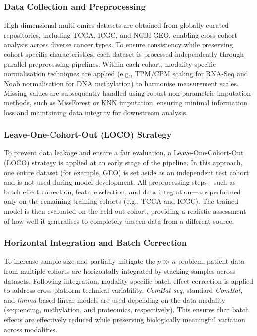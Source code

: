 \documentclass[conference]{IEEEtran}
\begin{document}
\subsubsection{Data Collection and Preprocessing} High-dimensional multi-omics datasets are obtained from globally curated repositories, including TCGA, ICGC, and NCBI GEO, enabling cross-cohort analysis across diverse cancer types. To ensure consistency while preserving cohort-specific characteristics, each dataset is processed independently through parallel preprocessing pipelines. Within each cohort, modality-specific normalisation techniques are applied (e.g., TPM/CPM scaling for RNA-Seq and Noob normalisation for DNA methylation) to harmonise measurement scales. Missing values are subsequently handled using robust non-parametric imputation methods, such as MissForest or KNN imputation, ensuring minimal information loss and maintaining data integrity for downstream analysis.
\subsubsection{Leave-One-Cohort-Out (LOCO) Strategy} To prevent data leakage and ensure a fair evaluation, a Leave-One-Cohort-Out (LOCO) strategy is applied at an early stage of the pipeline. In this approach, one entire dataset (for example, GEO) is set aside as an independent test cohort and is not used during model development. All preprocessing steps—such as batch effect correction, feature selection, and data integration—are performed only on the remaining training cohorts (e.g., TCGA and ICGC). The trained model is then evaluated on the held-out cohort, providing a realistic assessment of how well it generalises to completely unseen data from a different source.
\subsubsection{Horizontal Integration and Batch Correction} To increase sample size and partially mitigate the \( p \gg n \) problem, patient data from multiple cohorts are horizontally integrated by stacking samples across datasets. Following integration, modality-specific batch effect correction is applied to address cross-platform technical variability. \textit{ComBat-seq}, standard \textit{ComBat}, and \textit{limma}-based linear models are used depending on the data modality (sequencing, methylation, and proteomics, respectively). This ensures that batch effects are effectively reduced while preserving biologically meaningful variation across modalities.
\end{document}
